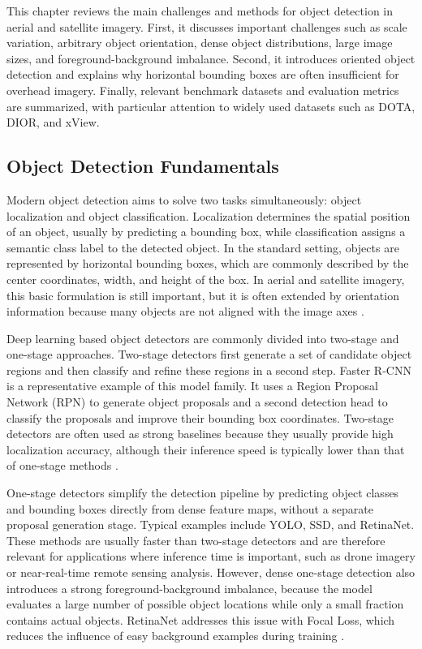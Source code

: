 This chapter reviews the main challenges and methods for object detection in aerial and satellite imagery. First, it discusses important challenges such as scale variation, arbitrary object orientation, dense object distributions, large image sizes, and foreground-background imbalance. Second, it introduces oriented object detection and explains why horizontal bounding boxes are often insufficient for overhead imagery. Finally, relevant benchmark datasets and evaluation metrics are summarized, with particular attention to widely used datasets such as DOTA, DIOR, and xView.

\subsection{Object Detection Fundamentals}

Modern object detection aims to solve two tasks simultaneously: object localization and object classification. Localization determines the spatial position of an object, usually by predicting a bounding box, while classification assigns a semantic class label to the detected object. In the standard setting, objects are represented by horizontal bounding boxes, which are commonly described by the center coordinates, width, and height of the box. In aerial and satellite imagery, this basic formulation is still important, but it is often extended by orientation information because many objects are not aligned with the image axes \cite{li2020object,ding2021object}.

Deep learning based object detectors are commonly divided into two-stage and one-stage approaches. Two-stage detectors first generate a set of candidate object regions and then classify and refine these regions in a second step. Faster R-CNN is a representative example of this model family. It uses a Region Proposal Network (RPN) to generate object proposals and a second detection head to classify the proposals and improve their bounding box coordinates. Two-stage detectors are often used as strong baselines because they usually provide high localization accuracy, although their inference speed is typically lower than that of one-stage methods \cite{li2020object}.

One-stage detectors simplify the detection pipeline by predicting object classes and bounding boxes directly from dense feature maps, without a separate proposal generation stage. Typical examples include YOLO, SSD, and RetinaNet. These methods are usually faster than two-stage detectors and are therefore relevant for applications where inference time is important, such as drone imagery or near-real-time remote sensing analysis. However, dense one-stage detection also introduces a strong foreground-background imbalance, because the model evaluates a large number of possible object locations while only a small fraction contains actual objects. RetinaNet addresses this issue with Focal Loss, which reduces the influence of easy background examples during training \cite{li2020object,lin2017focal}.

